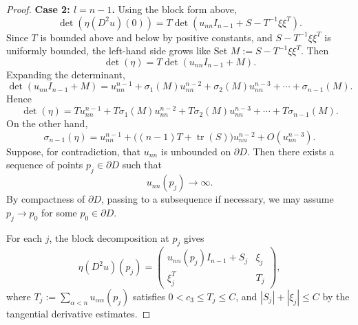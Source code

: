 \documentclass[10pt,a4paper]{amsart}
\begin{document}
\begin{proof}
		\noindent\textbf{Case 2: $l=n-1$.}
		Using the block form above,
		\[
		\det(\eta(D^2 u)(0)) = T \det\left( u_{nn} I_{n-1} + S - T^{-1} \xi \xi^T \right).
		\]
		Since $T$ is bounded above and below by positive constants, and $S - T^{-1}\xi\xi^T$ is uniformly bounded, the left-hand side grows like
		Set $M:=S-T^{-1}\xi\xi^T$. Then
		\[
		\det(\eta)=T\det(u_{nn}I_{n-1}+M).
		\]
		Expanding the determinant,
		\begin{equation}
			\det(u_{nn} I_{n-1} + M)
			=
			u_{nn}^{n-1}
			+
			\sigma_1(M) u_{nn}^{n-2}
			+
			\sigma_2(M) u_{nn}^{n-3}
			+
			\cdots
			+
			\sigma_{n-1}(M).
		\end{equation}
		Hence
		\begin{equation}
			\det(\eta)
			=
			T u_{nn}^{n-1}
			+
			T\sigma_1(M) u_{nn}^{n-2}
			+
			T\sigma_2(M) u_{nn}^{n-3}
			+
			\cdots
			+
			T\sigma_{n-1}(M).
		\end{equation}
		On the other hand,
		\begin{equation}
			\sigma_{n-1}(\eta)
			=
			u_{nn}^{n-1}
			+
			\big((n-1)T+\operatorname{tr}(S)\big)u_{nn}^{n-2}
			+
			O(u_{nn}^{n-3}).
		\end{equation}
		Suppose, for contradiction, that $u_{nn}$ is unbounded on $\partial D$. 
		Then there exists a sequence of points $p_j \in \partial D$ such that
		\begin{equation}
			u_{nn}(p_j) \to \infty.
		\end{equation}
		By compactness of $\partial D$, passing to a subsequence if necessary, 
		we may assume $p_j \to p_0$ for some $p_0 \in \partial D$.
		
		For each $j$, the block decomposition at $p_j$ gives
		\[
		\eta(D^2u)(p_j)=\begin{pmatrix}
			u_{nn}(p_j)I_{n-1}+S_j & \xi_j\\
			\xi_j^T & T_j
		\end{pmatrix},
		\]
		where $T_j:=\sum_{\alpha<n}u_{\alpha\alpha}(p_j)$ satisfies $0<c_3\le T_j\le C$, and $|S_j|+|\xi_j|\le C$ by the tangential derivative estimates.
		

\end{proof}
\end{document}
